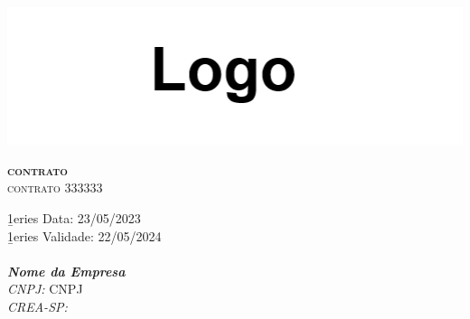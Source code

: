 
\begin{titlepage}

\begin{center}
\includegraphics[width=1\textwidth]{000-Logo}\\[2cm]
\vbox{ }
\vbox{ }

\color{Sepia}
\textsc{\huge \textbf{contrato}}\\[2.5cm]
\textsc{\LARGE contrato 333333}\\[2.5cm]
\vbox{ }

\color{Gray}

{ \Large \b1eries Data: 23/05/2023}\\[0.25cm]
{ \large \b1eries Validade: 22/05/2024}\\[3.5cm]
\HRule \\[0.05cm]

\textbf{\emph{Nome da Empresa}}\\
\emph{CNPJ:}
CNPJ\\
\emph{CREA-SP:}

\vfill

\end{center}
\end{titlepage}

